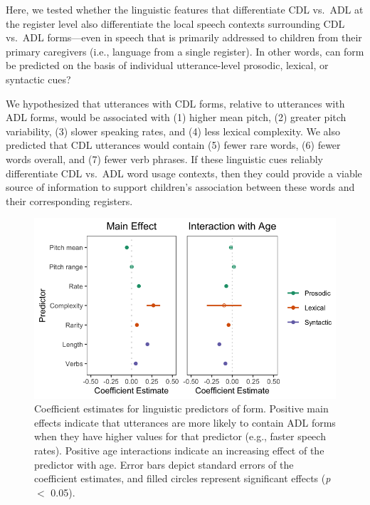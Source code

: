 \documentclass[10pt, letterpaper]{article}
\newenvironment{CodeChunk}{}{}
\begin{document}
Here, we tested whether the linguistic features that differentiate CDL
vs.~ADL at the register level also differentiate the local speech
contexts surrounding CDL vs.~ADL forms---even in speech that is
primarily addressed to children from their primary caregivers (i.e.,
language from a single register). In other words, can form be predicted
on the basis of individual utterance-level prosodic, lexical, or
syntactic cues?

We hypothesized that utterances with CDL forms, relative to utterances
with ADL forms, would be associated with (1) higher mean pitch, (2)
greater pitch variability, (3) slower speaking rates, and (4) less
lexical complexity. We also predicted that CDL utterances would contain
(5) fewer rare words, (6) fewer words overall, and (7) fewer verb
phrases. If these linguistic cues reliably differentiate CDL vs.~ADL
word usage contexts, then they could provide a viable source of
information to support children's association between these words and
their corresponding registers.

\begin{CodeChunk}
\begin{figure}[h]

{\centering \includegraphics{figs/ling-predictors-fig-1} 

}

\caption[Coefficient estimates for linguistic predictors of form]{Coefficient estimates for linguistic predictors of form. Positive main effects indicate that utterances are more likely to contain ADL forms when they have higher values for that predictor (e.g., faster speech rates). Positive age interactions indicate an increasing effect of the predictor with age. Error bars depict standard errors of the coefficient estimates, and filled circles represent significant effects (\textit{p} $<$ 0.05).}\label{fig:ling-predictors-fig}
\end{figure}
\end{CodeChunk}
\end{document}
